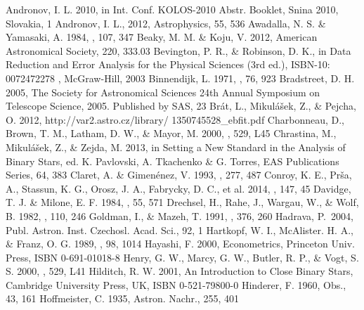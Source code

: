 \documentclass{aa}
\begin{document}
\begin{thebibliography}{}
 Andronov, I. L. 2010, in Int. Conf. KOLOS-2010 Abstr. Booklet, Snina 2010, Slovakia, 1
 Andronov, I. L., 2012, Astrophysics, 55, 536
 Awadalla, N. S. \& Yamasaki, A. 1984, \apss, 107, 347
 Beaky, M. M. \& Koju, V. 2012, American Astronomical Society, 220, 333.03
 Bevington, P. R., \& Robinson, D. K., in Data Reduction and Error Analysis for the Physical Sciences (3rd ed.), ISBN-10: 0072472278 , McGraw-Hill, 2003
 Binnendijk, L. 1971, \aj, 76, 923
 Bradstreet, D. H. 2005, The Society for Astronomical Sciences 24th Annual Symposium on Telescope Science, 2005. Published by SAS, 23
 Br\'{a}t, L., Mikul\'a\v{s}ek, Z., \& Pejcha, O. 2012, http://var2.astro.cz/library/ 1350745528\_ebfit.pdf
 Charbonneau, D., Brown, T. M., Latham, D. W., \& Mayor, M. 2000, \apj, 529, L45
 Chrastina, M., Mikul\'a\v{s}ek, Z., \& Zejda, M. 2013, in Setting a New Standard in the Analysis of Binary Stars, ed. K. Pavlovski, A. Tkachenko \& G. Torres, EAS Publications Series, 64, 383
 Claret, A. \&  Gimen\'enez, V. 1993, \aap, 277, 487
 Conroy, K. E., Pr\v{s}a, A., Stassun, K. G., Orosz, J. A., Fabrycky, D. C., et al. 2014, \aj, 147, 45
 Davidge, T. J. \& Milone, E. F. 1984, \apjs, 55, 571
 Drechsel, H., Rahe, J., Wargau, W., \& Wolf, B. 1982, \aap, 110, 246
 Goldman, I., \& Mazeh, T. 1991, \apj, 376, 260
 Hadrava, P.\ 2004, Publ. Astron. Inst. Czechosl. Acad. Sci., 92, 1
 Hartkopf, W. I., McAlister. H. A., \& Franz, O. G. 1989, \aj, 98, 1014
 Hayashi, F. 2000, Econometrics, Princeton Univ. Press, ISBN 0-691-01018-8
 Henry, G. W., Marcy, G. W., Butler, R. P., \& Vogt, S. S. 2000, \apj, 529, L41
 Hilditch, R. W. 2001, An Introduction to Close Binary Stars, Cambridge University Press, UK, ISBN 0-521-79800-0
 Hinderer, F. 1960, Obs., 43, 161
 Hoffmeister, C. 1935, Astron. Nachr., 255, 401

\end{thebibliography}
\end{document}
